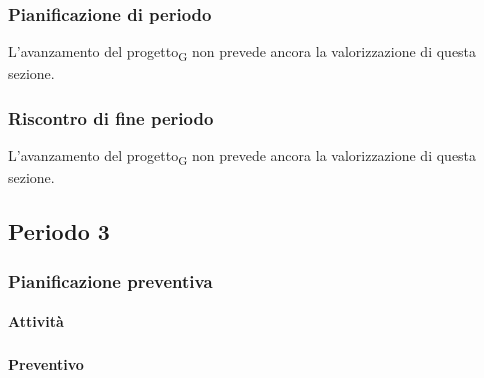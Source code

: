 \subsubsection{Pianificazione di periodo}

L'avanzamento del progetto\textsubscript{G} non prevede ancora la valorizzazione di questa sezione.



\subsubsection{Riscontro di fine periodo}

L'avanzamento del progetto\textsubscript{G} non prevede ancora la valorizzazione di questa sezione.





\pagebreak
\subsection{Periodo 3}

\subsubsection{Pianificazione preventiva}

\paragraph{Attività}
\subparagraph*{}

\planningTable{
	
}

\paragraph{Preventivo}
\subparagraph*{}


